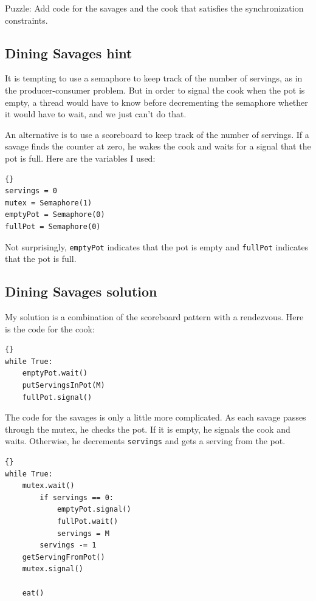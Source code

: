 \documentclass{book}
\newcommand{\clearemptydoublepage}{\newpage\cleardoublepage}
\begin{document}
Puzzle: Add code for the savages and the cook that
satisfies the synchronization constraints.


\clearemptydoublepage
\subsection{Dining Savages hint}

It is tempting to use a semaphore to keep track of the number of
servings, as in the producer-consumer problem.  But in order to signal
the cook when the pot is empty, a thread would have to know before
decrementing the semaphore whether it would have to wait, and we just
can't do that.

An alternative is to use a scoreboard to
keep track of the number of servings.  If a savage finds
the counter at zero, he wakes the cook and waits for a signal
that the pot is full.  Here are the variables I used:

\begin{lstlisting}[caption={Dining Savages hint}]{}
servings = 0
mutex = Semaphore(1)
emptyPot = Semaphore(0)
fullPot = Semaphore(0)
\end{lstlisting}

Not surprisingly, {\tt emptyPot} indicates that the pot is empty and
{\tt fullPot} indicates that the pot is full.

\clearemptydoublepage
\subsection{Dining Savages solution}

My solution is a combination of the scoreboard pattern
with a rendezvous.
Here is the code for the cook:

\begin{lstlisting}[caption={Dining Savages solution (cook)}]{}
while True:
    emptyPot.wait()
    putServingsInPot(M)
    fullPot.signal()
\end{lstlisting}

The code for the savages is only a little more complicated.
As each savage passes through the mutex, he checks the pot.
If it is empty, he signals the cook and waits.  Otherwise,
he decrements {\tt servings} and gets a serving from the pot.

\begin{lstlisting}[caption={Dining Savages solution (savage)}]{}
while True:
    mutex.wait()
        if servings == 0:
            emptyPot.signal()
            fullPot.wait()
            servings = M
        servings -= 1
	getServingFromPot()
    mutex.signal()

    eat()
\end{lstlisting}
\end{document}

